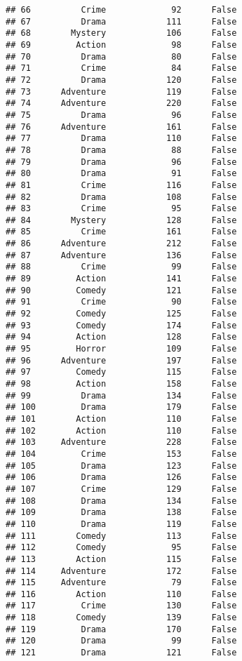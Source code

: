 \documentclass[
]{article}
\begin{document}
\begin{verbatim}
## 66          Crime             92      False
## 67          Drama            111      False
## 68        Mystery            106      False
## 69         Action             98      False
## 70          Drama             80      False
## 71          Crime             84      False
## 72          Drama            120      False
## 73      Adventure            119      False
## 74      Adventure            220      False
## 75          Drama             96      False
## 76      Adventure            161      False
## 77          Drama            110      False
## 78          Drama             88      False
## 79          Drama             96      False
## 80          Drama             91      False
## 81          Crime            116      False
## 82          Drama            108      False
## 83          Crime             95      False
## 84        Mystery            128      False
## 85          Crime            161      False
## 86      Adventure            212      False
## 87      Adventure            136      False
## 88          Crime             99      False
## 89         Action            141      False
## 90         Comedy            121      False
## 91          Crime             90      False
## 92         Comedy            125      False
## 93         Comedy            174      False
## 94         Action            128      False
## 95         Horror            109      False
## 96      Adventure            197      False
## 97         Comedy            115      False
## 98         Action            158      False
## 99          Drama            134      False
## 100         Drama            179      False
## 101        Action            110      False
## 102        Action            110      False
## 103     Adventure            228      False
## 104         Crime            153      False
## 105         Drama            123      False
## 106         Drama            126      False
## 107         Crime            129      False
## 108         Drama            134      False
## 109         Drama            138      False
## 110         Drama            119      False
## 111        Comedy            113      False
## 112        Comedy             95      False
## 113        Action            115      False
## 114     Adventure            172      False
## 115     Adventure             79      False
## 116        Action            110      False
## 117         Crime            130      False
## 118        Comedy            139      False
## 119         Drama            170      False
## 120         Drama             99      False
## 121         Drama            121      False

\end{verbatim}
\end{document}
